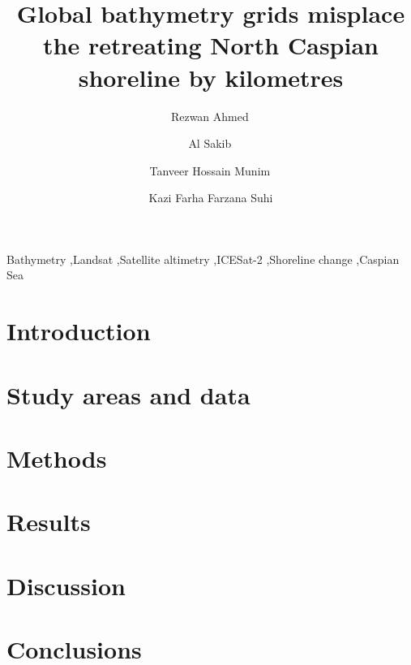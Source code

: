 \documentclass[preprint,12pt,authoryear]{elsarticle}
\begin{document}
\begin{frontmatter}

\title{Global bathymetry grids misplace the retreating North Caspian shoreline by kilometres}

\author[dhaka]{Rezwan Ahmed\,}
\author[dhaka]{Al Sakib\,}
\author[rimes]{Tanveer Hossain Munim\,}
\author[ufl]{Kazi Farha Farzana Suhi}



\begin{keyword}
Bathymetry \sep Landsat \sep Satellite altimetry \sep ICESat-2 \sep Shoreline change \sep Caspian Sea
\end{keyword}

\end{frontmatter}


\section{Introduction}
\label{sec:intro}


\FloatBarrier
\section{Study areas and data}
\label{sec:data}


\FloatBarrier
\section{Methods}
\label{sec:methods}


\FloatBarrier
\section{Results}
\label{sec:results}


\FloatBarrier
\section{Discussion}
\label{sec:discussion}


\section{Conclusions}
\label{sec:conclusions}






\end{document}
